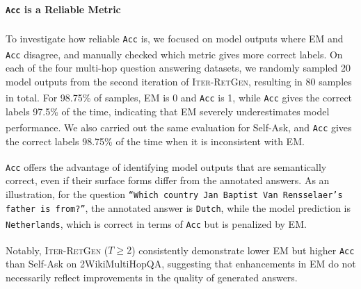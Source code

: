 \documentclass[11pt]{article}
\begin{document}
\paragraph{\texttt{Acc\textsuperscript{\dag}} is a Reliable Metric}
To investigate how reliable \texttt{Acc\textsuperscript{\dag}} is, we focused on model outputs where EM and \texttt{Acc\textsuperscript{\dag}} disagree, and manually checked which metric gives more correct labels.
On each of the four multi-hop question answering datasets, we randomly sampled 20 model outputs from the second iteration of I\textsc{ter}-R\textsc{et}G\textsc{en}, resulting in 80 samples in total.
For 98.75\% of samples, EM is 0 and \texttt{Acc\textsuperscript{\dag}} is 1,
while \texttt{Acc\textsuperscript{\dag}} gives the correct labels 97.5\% of the time, indicating that EM severely underestimates model performance.
We also carried out the same evaluation for Self-Ask, and \texttt{Acc\textsuperscript{\dag}} gives the correct labels 98.75\% of the time when it is inconsistent with EM.

\texttt{Acc\textsuperscript{\dag}} offers the advantage of identifying model outputs that are semantically correct, even if their surface forms differ from the annotated answers.
As an illustration, for the question \texttt{``Which country Jan Baptist Van Rensselaer's father is from?''}, the annotated answer is \texttt{Dutch}, while the model prediction is \texttt{Netherlands}, which is correct in terms of \texttt{Acc\textsuperscript{\dag}} but is penalized by EM.

Notably, I\textsc{ter}-R\textsc{et}G\textsc{en} ($T \ge 2$) consistently demonstrate lower EM but higher \texttt{Acc\textsuperscript{\dag}} than Self-Ask on 2WikiMultiHopQA, suggesting that enhancements in EM do not necessarily reflect improvements in the quality of generated answers.

\begingroup
\setlength{\tabcolsep}{3pt} %
\renewcommand{\arraystretch}{1} %
\begin{table}[htb]
    \centering
    \caption{Answer recall of retrieved paragraphs in different iterations for I\textsc{ter}-R\textsc{et}G\textsc{en}.}
    \label{tab:answer_recall}
\end{table}
\endgroup
\end{document}
